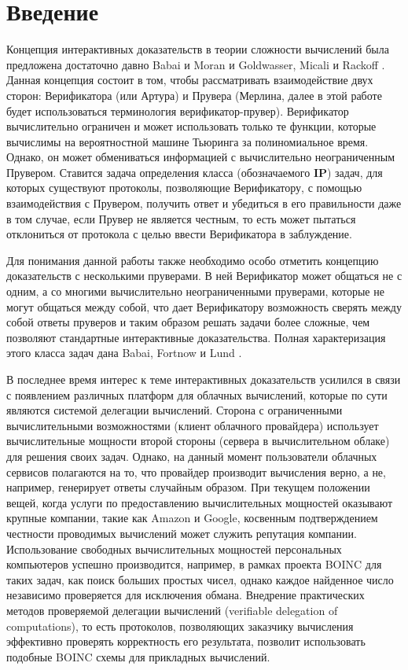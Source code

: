 \documentclass[14pt, a4paper]{extreport}
\begin{document}
\chapter*{Введение}
Концепция интерактивных доказательств в теории сложности вычислений была предложена достаточно давно Babai и Moran \cite{babai1988arthur} и Goldwasser, Micali и Rackoff \cite{goldwasser1989ip}. Данная концепция состоит в том, чтобы рассматривать взаимодействие двух сторон: Верификатора (или Артура) и Прувера (Мерлина, далее в этой работе будет использоваться терминология верификатор-прувер). Верификатор вычислительно ограничен и может использовать только те функции, которые вычислимы на вероятностной машине Тьюринга за полиномиальное время. Однако, он может обмениваться информацией с вычислительно неограниченным Прувером. Ставится задача определения класса (обозначаемого $\textbf{IP}$) задач, для которых существуют протоколы, позволяющие Верификатору, с помощью взаимодействия с Прувером, получить ответ и убедиться в его правильности даже в том случае, если Прувер не является честным, то есть может пытаться отклониться от протокола с целью ввести Верификатора в заблуждение.

Для понимания данной работы также необходимо особо отметить концепцию доказательств с несколькими пруверами. В ней Верификатор может общаться не с одним, а со многими вычислительно неограниченными пруверами, которые не могут общаться между собой, что дает Верификатору возможность сверять между собой ответы пруверов и таким образом решать задачи более сложные, чем позволяют стандартные интерактивные доказательства. Полная характеризация этого класса задач дана Babai, Fortnow и Lund \cite{babai1991mip}.

В последнее время интерес к теме интерактивных доказательств усилился в связи с появлением различных платформ для облачных вычислений, которые по сути являются системой делегации вычислений. Сторона с ограниченными вычислительными возможностями (клиент облачного провайдера) использует вычислительные мощности второй стороны (сервера в вычислительном облаке) для решения своих задач. Однако, на данный момент пользователи облачных сервисов полагаются на то, что провайдер производит вычисления верно, а не, например, генерирует ответы случайным образом. При текущем положении вещей, когда услуги по предоставлению вычислительных мощностей оказывают крупные компании, такие как Amazon и Google, косвенным подтверждением честности проводимых вычислений может служить репутация компании. Использование свободных вычислительных мощностей персональных компьютеров успешно производится, например, в рамках проекта BOINC \cite{anderson2004boinc} для таких задач, как поиск больших простых чисел, однако каждое найденное число независимо проверяется для исключения обмана. Внедрение практических методов проверяемой делегации вычислений (verifiable delegation of computations), то есть протоколов, позволяющих заказчику вычисления эффективно проверять корректность его результата, позволит использовать подобные BOINC схемы для прикладных вычислений.
\end{document}
